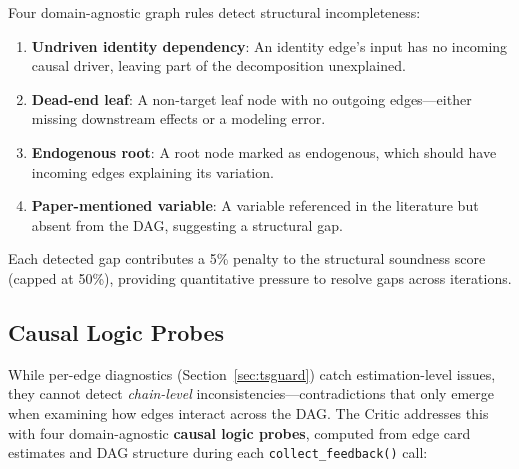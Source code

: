 \documentclass{article}
\begin{document}
Four domain-agnostic graph rules detect structural incompleteness:

\begin{enumerate}[leftmargin=*, itemsep=1pt]
    \item \textbf{Undriven identity dependency}: An identity edge's input has no incoming causal driver, leaving part of the decomposition unexplained.
    \item \textbf{Dead-end leaf}: A non-target leaf node with no outgoing edges---either missing downstream effects or a modeling error.
    \item \textbf{Endogenous root}: A root node marked as endogenous, which should have incoming edges explaining its variation.
    \item \textbf{Paper-mentioned variable}: A variable referenced in the literature but absent from the DAG, suggesting a structural gap.
\end{enumerate}

Each detected gap contributes a 5\% penalty to the structural soundness score (capped at 50\%), providing quantitative pressure to resolve gaps across iterations.

\subsection{Causal Logic Probes}
\label{sec:probes}

While per-edge diagnostics (Section~\ref{sec:tsguard}) catch estimation-level issues, they cannot detect \emph{chain-level} inconsistencies---contradictions that only emerge when examining how edges interact across the DAG. The Critic addresses this with four domain-agnostic \textbf{causal logic probes}, computed from edge card estimates and DAG structure during each \texttt{collect\_feedback()} call:
\end{document}
